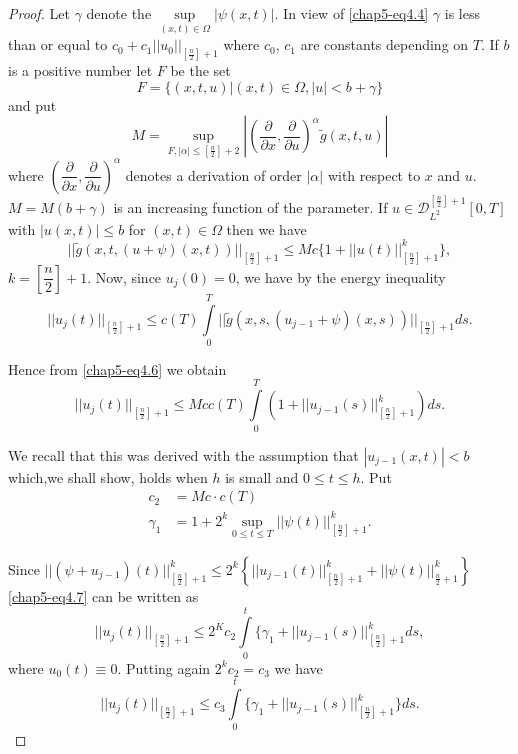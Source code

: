 \begin{proof}
Let $\gamma$ denote the $\sup\limits_{(x, t) \in \Omega} | \psi
(x, t) |$. In view of \eqref{chap5-eq4.4} $\gamma$ is less than or
equal to $c_0 + c_1 || u_0 ||_{\left[\frac{n}{2} \right]+1} $ where
$c_0$, $c_1$ are constants 
depending on $T$. If $b$ is a positive number let $F$ be the set  
$$
F= \{(x, t, u) | (x, t) \in \Omega, |u | < b + \gamma \} 
$$
and put 
\begin{equation*}
M = \sup\limits_{F,|\alpha|\leq \left[\frac{n}{2}\right]+2} |
\left(\frac{\partial}{\partial x}, \frac{\partial }{\partial
  u}\right)^\alpha \tilde{g} (x, t, u)| \tag{4.5}\label{chap5-eq4.5} 
\end{equation*}
where $\left(\dfrac{\partial}{\partial x}, \dfrac{\partial }{\partial
  u}\right)^\alpha$ denotes a derivation of order $|\alpha|$ with respect to
$x$ and $u$. $M = M(b+ \gamma)$ is an increasing function of the
parameter. If $u \in \mathscr{D}^{\left[\frac{n}{2}\right] +
  1}_{L^2} [0, T]$ with $| u(x, t) | \leq b$ for $(x, t)\in
\Omega$ then we have   
\begin{equation*}
||\tilde{g}(x, t, (u + \psi) (x,
t))||_{\left[\frac{n}{2}\right]+1}\leq M c \{ 1 
+ || u(t) ||^k_{\left[\frac{n}{2}\right]+1} \},
\tag{4.6} \label{chap5-eq4.6} 
\end{equation*}
$k = \left[\dfrac{n}{2} \right] + 1$. Now, since $u_j (0) = 0$, we
have by the energy inequality 
$$
|| u_j(t) ||_{\left[\frac{n}{2}
    \right]+1}\leq c (T) \int\limits^T_0 || \tilde{g} (x, s, (u_{j-1}
+  \psi) (x, s))||_{\left[\frac{n}{2}\right]+1}ds.
$$
  
Hence from \eqref{chap5-eq4.6} we obtain 
\begin{equation*}
||u_j (t)||_{[\frac{n}{2}] + 1}\leq M c c (T) \int\limits_0^T (1 + ||
u_{j - 1}(s) ||^k _{[\frac{n}{2}]+1}) ds. \tag{4.7}\label{chap5-eq4.7} 
\end{equation*}

We recall that this was derived with the assumption that $|u_{j -
  1}(x, t)| < b$ which,\pageoriginale we shall show, holds when $h$ is
small and $0 \leq t \leq h$. Put   
\begin{align*}
c_2 & = M c \cdot c (T) \\
\gamma_1 & =  1 + 2^k \sup_{ 0 \leq t \leq T} || \psi (t)
||^k_{\left[\frac{n}{2} \right]+1} .\tag{4.8}\label{chap5-eq4.8}  
\end{align*}

Since $|| (\psi + u_{j-1}) (t) ||^k_{\left[\frac{n}{2}\right]+1}\leq
2^k \left\{||u_{j-1}(t)||^k_{[\frac{n}{2}]+1} + || \psi
(t)||^k_{\frac{n}{2}+1} \right\}$ \eqref{chap5-eq4.7} can be written as   
$$
|| u_j (t) ||_{[\frac{n}{2}] + 1}\leq 2^Kc_2\int\limits_0^t
\{\gamma_1 + || u_{j-1}(s) ||^k_{[\frac{n}{2}]+1} ds,  
$$
where $u_0 (t) \equiv 0$. Putting again $2^kc_2= c_3$ we have 
\begin{equation*}
||u_j (t) ||_{\left[\frac{n}{2}\right]+1}\leq c_3 \int\limits^t_0 \{\gamma_1 + ||
u_{j-1}(s) ||^k_{\left[\frac{n}{2}\right]+1} \}
ds. \tag{4.9} \label{chap5-eq4.9} 
\end{equation*}


\end{proof}
